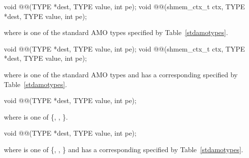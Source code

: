 
\begin{apidefinition}

\begin{C11synopsis}
void @@(TYPE *dest, TYPE value, int pe);
void @@(shmem_ctx_t ctx, TYPE *dest, TYPE value, int pe);
\end{C11synopsis}
where \TYPE{} is one of the standard \ac{AMO} types specified by
Table~\ref{stdamotypes}.

\begin{Csynopsis}
void @@(TYPE *dest, TYPE value, int pe);
void @@(shmem_ctx_t ctx, TYPE *dest, TYPE value, int pe);
\end{Csynopsis}
where \TYPE{} is one of the standard \ac{AMO} types and has a corresponding
\TYPENAME{} specified by Table~\ref{stdamotypes}.

\begin{DeprecateBlock}
\begin{C11synopsis}
void @@(TYPE *dest, TYPE value, int pe);
\end{C11synopsis}
where \TYPE{} is one of \{, , \}.

\begin{Csynopsis}
void @@(TYPE *dest, TYPE value, int pe);
\end{Csynopsis}
where \TYPE{} is one of \{, , \}
and has a corresponding \TYPENAME{} specified by Table~\ref{stdamotypes}.
\end{DeprecateBlock}

\begin{apiarguments}
\end{apiarguments}


\end{apidefinition}
